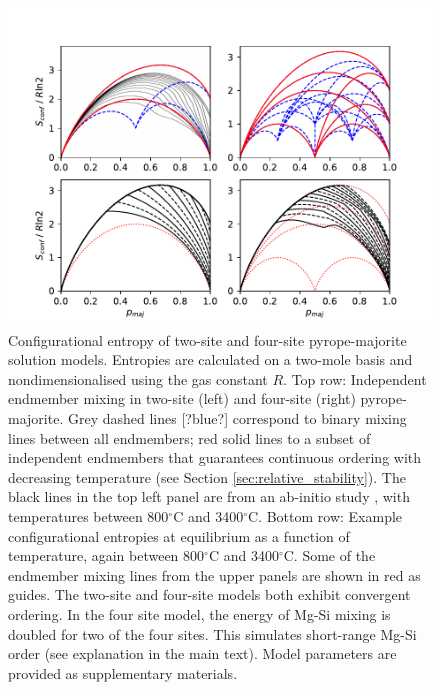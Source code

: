 \documentclass[preprint,12pt]{elsarticle}
\begin{document}
\begin{figure}[htb!]
  \centering
  \includegraphics[width=\textwidth]{figures/py_maj_solution_entropies.pdf}
  \caption{Configurational entropy of two-site and four-site pyrope-majorite solution models. Entropies are calculated on a two-mole basis and nondimensionalised using the gas constant $R$. Top row: Independent endmember mixing in two-site (left) and four-site (right) pyrope-majorite. Grey dashed lines [?blue?] correspond to binary mixing lines between all endmembers; red solid lines to a subset of independent endmembers that guarantees continuous ordering with decreasing temperature (see Section \ref{sec:relative_stability}). The black lines in the top left panel are from an ab-initio study \citep{Vinograd2006}, with temperatures between 800$^{\circ}$C and 3400$^{\circ}$C. Bottom row: Example configurational entropies at equilibrium as a function of temperature, again between 800$^{\circ}$C and 3400$^{\circ}$C. Some of the endmember mixing lines from the upper panels are shown in red as guides. The two-site and four-site models both exhibit convergent ordering. In the four site model, the energy of Mg-Si mixing is doubled for two of the four sites. This simulates short-range Mg-Si order (see explanation in the main text). Model parameters are provided as supplementary materials.}
  \label{fig:pyrope_majorite_two_four_sites}
\end{figure}
\end{document}
